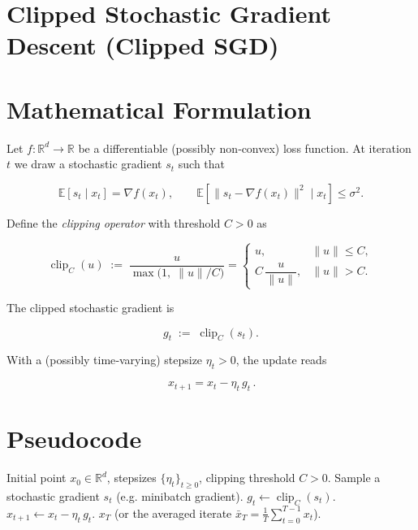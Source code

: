 \documentclass{article}
\newcommand{\E}{\mathbb{E}}
\newcommand{\R}{\mathbb{R}}
\begin{document}
\section*{Clipped Stochastic Gradient Descent (Clipped SGD)}

\section*{Mathematical Formulation}
Let $f:\R^{d}\rightarrow\R$ be a differentiable (possibly non‑convex) loss function.
At iteration $t$ we draw a stochastic gradient $s_{t}$ such that  

\[
\E\!\left[s_{t}\mid x_{t}\right]=\nabla f(x_{t}),\qquad 
\E\!\left[\|s_{t}-\nabla f(x_{t})\|^{2}\mid x_{t}\right]\le\sigma^{2}.
\]

Define the \emph{clipping operator} with threshold $C>0$ as  

\[
\operatorname{clip}_{C}(u)\;:=\;
\frac{u}{\max\!\bigl(1,\;\|u\|/C\bigr)}
=
\begin{cases}
u, & \|u\|\le C,\\[4pt]
C\,\dfrac{u}{\|u\|}, & \|u\|>C .
\end{cases}
\]

The clipped stochastic gradient is  

\[
g_{t}\;:=\;\operatorname{clip}_{C}(s_{t}).
\]

With a (possibly time‑varying) stepsize $\eta_{t}>0$, the update reads  

\[
\boxed{\,x_{t+1}=x_{t}-\eta_{t}\,g_{t}\,}. \tag{1}
\]

\section*{Pseudocode}
\begin{algorithm}[H]
\caption{Clipped SGD}
\begin{algorithmic}[1]
\REQUIRE Initial point $x_{0}\in\R^{d}$, stepsizes $\{\eta_{t}\}_{t\ge0}$, clipping threshold $C>0$.
    \STATE Sample a stochastic gradient $s_{t}$ (e.g. minibatch gradient).
    \STATE $g_{t}\leftarrow \operatorname{clip}_{C}(s_{t})$.
    \STATE $x_{t+1}\leftarrow x_{t}-\eta_{t}\,g_{t}$.
\ENDFOR
\RETURN $x_{T}$ (or the averaged iterate $\bar x_{T}= \frac1T\sum_{t=0}^{T-1}x_{t}$).
\end{algorithmic}
\end{algorithm}
\end{document}
